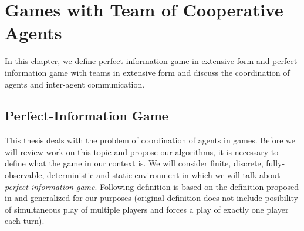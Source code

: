 \chapter{Games with Team of Cooperative Agents}
\label{chap_mas}



In this chapter, we define perfect-information game in extensive form and perfect-information
game with teams in extensive form and discuss the coordination of agents and inter-agent
communication.


\section{Perfect-Information Game}


\label{sec_perfect_information_game}

This thesis deals with the problem of coordination of agents in games. Before we will review
work on this topic and propose our algorithms, it is necessary to define what the game in our
context is. We will consider finite, discrete, fully-observable, deterministic and static
environment in which we will talk about \emph{perfect-information game}. Following definition
is based on the definition
proposed in \cite{MAS2008} and generalized for our purposes (original definition does not
include posibility of simultaneous play of multiple players and forces a play of exactly one
player each turn).


